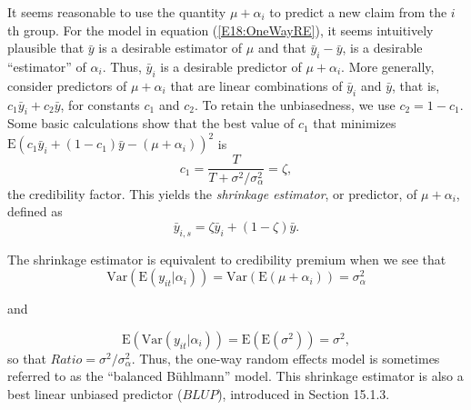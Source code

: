 It seems reasonable to use the quantity $\mu + \alpha_i$ to predict
a new claim from the $i$th group. For the model in equation
(\ref{E18:OneWayRE}), it seems intuitively plausible that $\bar{y}$
is a desirable estimator of $\mu$ and that $\bar{y}_i-\bar{y}$, is a
desirable ``estimator'' of $\alpha_i$. Thus, $\bar{y}_i$ is a
desirable predictor of $\mu+\alpha_i$. More generally, consider
predictors of $\mu+\alpha_i$ that are linear combinations of
$\bar{y}_i$  and $\bar{y}$, that is, $c_1 \bar{y}_i+c_2\bar{y}$, for
constants $c_1$ and $c_2$. To retain the unbiasedness, we use $c_2 =
1 - c_1$. Some basic calculations show that the best value of $c_1$
that minimizes $\mathrm{E} \left( c_1 \bar{y}_i+(1-c_1)\bar{y} -
(\mu+\alpha_i) \right)^2$ is
\begin{equation*}
c_1 = \frac{T}{T+\sigma^2/\sigma^2_{\alpha}} = \zeta,
\end{equation*}
the credibility factor. This yields the \emph{shrinkage estimator},
or predictor, of $\mu+\alpha_i$, defined as
\begin{equation}\label{E18:Shrinkage}
\bar{y}_{i,s} = \zeta \bar{y}_i+(1-\zeta)\bar{y}.
\end{equation}

The shrinkage estimator is equivalent to credibility premium when we
see that \begin{equation*} \mathrm{Var}
\left(\mathrm{E}(y_{it}|\alpha_i) \right) = \mathrm{Var}
\left(\mathrm{E}(\mu+\alpha_i) \right) =
\sigma^2_{\alpha}\end{equation*}

and

\begin{equation*} \mathrm{E}
\left(\mathrm{Var}(y_{it}|\alpha_i) \right) = \mathrm{E}
\left(\mathrm{E}(\sigma^2) \right) = \sigma^2 ,
\end{equation*}
so that $Ratio = \sigma^2/\sigma^2_{\alpha}$. Thus, the one-way
random effects model is sometimes referred to as the ``balanced
B\"{u}hlmann'' model. This shrinkage estimator is also a best linear
unbiased predictor ($BLUP$), introduced in Section 15.1.3.

\linejed{}

